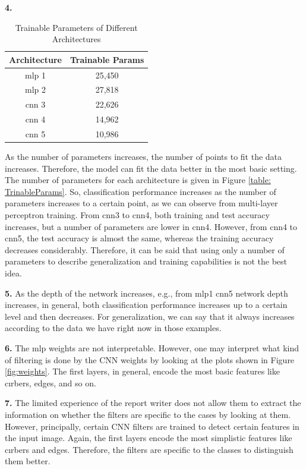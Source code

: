 \documentclass{assignment}
\begin{document}
\textbf{4.}

\begin{table}[h]
    \centering
    \begin{tabular}{|c|c|}
    \hline
    \textbf{Architecture} & \textbf{Trainable Params} \\
    \hline
    mlp 1 & 25,450 \\
    mlp 2 & 27,818 \\
    cnn 3 & 22,626 \\
    cnn 4 & 14,962 \\
    cnn 5 & 10,986 \\
    \hline
    \end{tabular}
    \caption{Trainable Parameters of Different Architectures}
    \label{table:TrinableParams}
\end{table}


\noindent As the number of parameters increases, the number of points to fit the data increases. Therefore, the model can fit the data better in the most basic setting. The number of parameters for each architecture is given in Figure \ref{table: TrinableParams}. So, classification performance increases as the number of parameters increases to a certain point, as we can observe from multi-layer perceptron training. From cnn3 to cnn4, both training and test accuracy increases, but a number of parameters are lower in cnn4. However, from cnn4 to cnn5, the test accuracy is almost the same, whereas the training accuracy decreases considerably. Therefore, it can be said that using only a number of parameters to describe generalization and training capabilities is not the best idea. 

\textbf{5.}
\noindent As the depth of the network increases, e.g., from mlp1 cnn5 network depth increases, in general, both classification performance increases up to a certain level and then decreases. For generalization, we can say that it always increases according to the data we have right now in those examples. 


\textbf{6.}
\noindent The mlp weights are not interpretable. However, one may interpret what kind of filtering is done by the CNN weights by looking at the plots shown in Figure \ref{fig:weights}. The first layers, in general, encode the most basic features like cırbers, edges, and so on.

\textbf{7.}
\noindent The limited experience of the report writer does not allow them to extract the information on whether the filters are specific to the cases by looking at them. However, principally, certain CNN filters are trained to detect certain features in the input image. Again, the first layers encode the most simplistic features like cırbers and edges. Therefore, the filters are specific to the classes to distinguish them better. 
\end{document}
